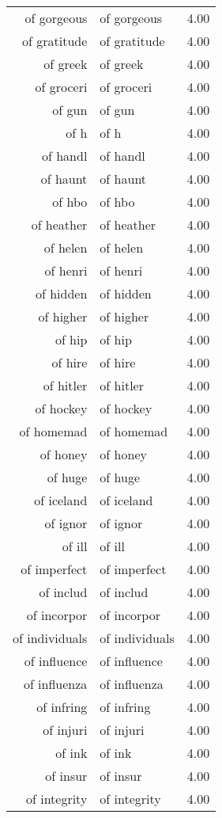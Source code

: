 \begin{table}[ht]
\begin{tabular}{rlr}
  of gorgeous & of gorgeous & 4.00 \\ 
  of gratitude & of gratitude & 4.00 \\ 
  of greek & of greek & 4.00 \\ 
  of groceri & of groceri & 4.00 \\ 
  of gun & of gun & 4.00 \\ 
  of h & of h & 4.00 \\ 
  of handl & of handl & 4.00 \\ 
  of haunt & of haunt & 4.00 \\ 
  of hbo & of hbo & 4.00 \\ 
  of heather & of heather & 4.00 \\ 
  of helen & of helen & 4.00 \\ 
  of henri & of henri & 4.00 \\ 
  of hidden & of hidden & 4.00 \\ 
  of higher & of higher & 4.00 \\ 
  of hip & of hip & 4.00 \\ 
  of hire & of hire & 4.00 \\ 
  of hitler & of hitler & 4.00 \\ 
  of hockey & of hockey & 4.00 \\ 
  of homemad & of homemad & 4.00 \\ 
  of honey & of honey & 4.00 \\ 
  of huge & of huge & 4.00 \\ 
  of iceland & of iceland & 4.00 \\ 
  of ignor & of ignor & 4.00 \\ 
  of ill & of ill & 4.00 \\ 
  of imperfect & of imperfect & 4.00 \\ 
  of includ & of includ & 4.00 \\ 
  of incorpor & of incorpor & 4.00 \\ 
  of individuals & of individuals & 4.00 \\ 
  of influence & of influence & 4.00 \\ 
  of influenza & of influenza & 4.00 \\ 
  of infring & of infring & 4.00 \\ 
  of injuri & of injuri & 4.00 \\ 
  of ink & of ink & 4.00 \\ 
  of insur & of insur & 4.00 \\ 
  of integrity & of integrity & 4.00 \\ 

\end{tabular}
\end{table}

